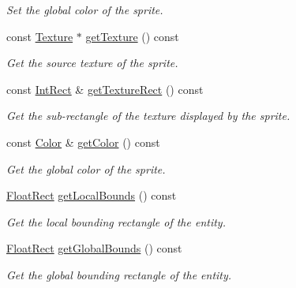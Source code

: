 \begin{DoxyCompactItemize}
\begin{DoxyCompactList}\small\item\em Set the global color of the sprite. \end{DoxyCompactList}\item 
const \mbox{\hyperlink{classsf_1_1_texture}{Texture}} $\ast$ \mbox{\hyperlink{classsf_1_1_sprite_a1a76155146c8ff37c4eb5a306b4e9ebe}{get\+Texture}} () const
\begin{DoxyCompactList}\small\item\em Get the source texture of the sprite. \end{DoxyCompactList}\item 
const \mbox{\hyperlink{classsf_1_1_rect}{Int\+Rect}} \& \mbox{\hyperlink{classsf_1_1_sprite_a3492896fe7b63f58ae022c5b8bec5c98}{get\+Texture\+Rect}} () const
\begin{DoxyCompactList}\small\item\em Get the sub-\/rectangle of the texture displayed by the sprite. \end{DoxyCompactList}\item 
const \mbox{\hyperlink{classsf_1_1_color}{Color}} \& \mbox{\hyperlink{classsf_1_1_sprite_ac5f419f37b4e38f7a94186e3a3e303e1}{get\+Color}} () const
\begin{DoxyCompactList}\small\item\em Get the global color of the sprite. \end{DoxyCompactList}\item 
\mbox{\hyperlink{classsf_1_1_rect}{Float\+Rect}} \mbox{\hyperlink{classsf_1_1_sprite_ab2f4c781464da6f8a52b1df6058a48b8}{get\+Local\+Bounds}} () const
\begin{DoxyCompactList}\small\item\em Get the local bounding rectangle of the entity. \end{DoxyCompactList}\item 
\mbox{\hyperlink{classsf_1_1_rect}{Float\+Rect}} \mbox{\hyperlink{classsf_1_1_sprite_aa795483096b90745b2e799532963e271}{get\+Global\+Bounds}} () const
\begin{DoxyCompactList}\small\item\em Get the global bounding rectangle of the entity. \end{DoxyCompactList}\end{DoxyCompactItemize}
